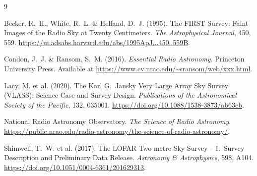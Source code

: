 \documentclass[11pt]{article}
\begin{document}
\begin{thebibliography}{9}

Becker, R.~H., White, R.~L. \& Helfand, D.~J. (1995).
The FIRST Survey: Faint Images of the Radio Sky at Twenty Centimeters.
\emph{The Astrophysical Journal}, 450, 559.
\url{https://ui.adsabs.harvard.edu/abs/1995ApJ...450..559B}.

Condon, J.~J. \& Ransom, S.~M. (2016).
\emph{Essential Radio Astronomy}.
Princeton University Press.
Available at
\url{https://www.cv.nrao.edu/~sransom/web/xxx.html}.

Lacy, M. et al. (2020).
The Karl G.\ Jansky Very Large Array Sky Survey (VLASS): Science Case
and Survey Design.
\emph{Publications of the Astronomical Society of the Pacific}, 132, 035001.
\url{https://doi.org/10.1088/1538-3873/ab63eb}.

National Radio Astronomy Observatory.
\emph{The Science of Radio Astronomy}.
\url{https://public.nrao.edu/radio-astronomy/the-science-of-radio-astronomy/}.

Shimwell, T.~W. et al. (2017).
The LOFAR Two-metre Sky Survey -- I.\ Survey Description and Preliminary
Data Release.
\emph{Astronomy \& Astrophysics}, 598, A104.
\url{https://doi.org/10.1051/0004-6361/201629313}.

\end{thebibliography}
\end{document}
